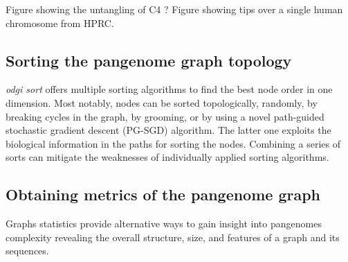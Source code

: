\documentclass{bioinfo}
\begin{document}
Figure showing the untangling of C4 ?
Figure showing tips over a single human chromosome from HPRC.

\subsection{Sorting the pangenome graph topology}
\label{sec:sort}





\textit{odgi sort} offers multiple sorting algorithms to find the best node order in one dimension. Most notably, nodes can be sorted topologically, randomly, by breaking cycles in the graph, by grooming, or by using a novel path-guided stochastic gradient descent (PG-SGD) algorithm.
The latter one exploits the biological information in the paths for sorting the nodes.
Combining a series of sorts can mitigate the weaknesses of individually applied sorting algorithms.


\subsection{Obtaining metrics of the pangenome graph}
\label{sec:metrics}



Graphs statistics provide alternative ways to gain insight into pangenomes complexity revealing the overall structure, size, and features of a graph and its sequences.
\end{document}
